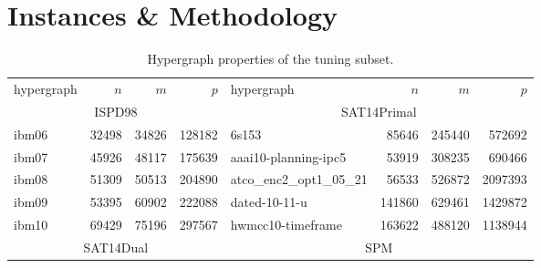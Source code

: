 \documentclass[a4paper,12pt,titlepage, BCOR7mm,headsepline]{scrbook}
\numberwithin{equation}{section}
\begin{document}
\section{Instances \& Methodology}
\begin{table}[H]
        \caption{Hypergraph properties of the tuning subset.}
\label{tbl:instancessmall}

\centering
\begin{adjustbox}{max width=\textwidth}
\begin{tabular}{lrrr||l|rrr}
hypergraph & $n$& $m$ & $p$ & hypergraph & $n$ & $m$ & $p$\\
                         \cline{1-4}
                         \cline{5-8}
                         \cline{5-8}
                         \cline{1-4}
                         \cline{1-4}
                         \multicolumn{4}{c||}{ISPD98}          & \multicolumn{4}{c}{SAT14Primal} \\
                         \cline{5-8}
                         \cline{5-8}
                         \cline{1-4}
                         \cline{1-4}

                         ibm06                                 & 32498   & 34826  & 128182 & 6s153                                                & 85646   & 245440 & 572692            \\
                         ibm07                                 & 45926   & 48117  & 175639& aaai10-planning-ipc5              & 53919   & 308235 & 690466   \\
                         ibm08                                 & 51309   & 50513  & 204890& atco\_enc2\_opt1\_05\_21                             & 56533   & 526872 & 2097393  \\
                         ibm09                                 & 53395   & 60902  & 222088& dated-10-11-u                                        & 141860  & 629461 & 1429872  \\
                         ibm10                                 & 69429   & 75196  & 297567& hwmcc10-timeframe & 163622  & 488120 & 1138944  \\
                         \cline{1-4}
                         \cline{1-4}
                         \cline{5-8}
                         \cline{5-8}
                         \multicolumn{4}{c||}{SAT14Dual} & \multicolumn{4}{c}{SPM} \\
                         \cline{5-8}
                         \cline{5-8}
                         \cline{1-4}
                         \cline{1-4}


\end{tabular}
\end{adjustbox}
\end{table}
\end{document}
